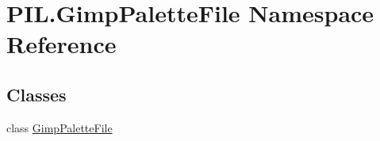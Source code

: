 \hypertarget{namespacePIL_1_1GimpPaletteFile}{}\section{P\+I\+L.\+Gimp\+Palette\+File Namespace Reference}
\label{namespacePIL_1_1GimpPaletteFile}
\subsection*{Classes}
\begin{DoxyCompactItemize}
\item 
class \hyperlink{classPIL_1_1GimpPaletteFile_1_1GimpPaletteFile}{Gimp\+Palette\+File}
\end{DoxyCompactItemize}
